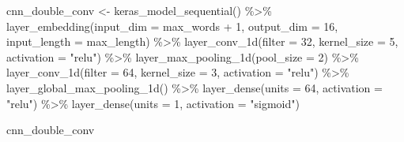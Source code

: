 \documentclass[
]{krantz}
\makeatletter
\newenvironment{Shaded}{\begin{snugshade}}{\end{snugshade}}
\newcommand{\AttributeTok}[1]{\textcolor[rgb]{0.77,0.63,0.00}{#1}}
\newcommand{\DecValTok}[1]{\textcolor[rgb]{0.00,0.00,0.81}{#1}}
\newcommand{\FunctionTok}[1]{\textcolor[rgb]{0.00,0.00,0.00}{#1}}
\newcommand{\NormalTok}[1]{#1}
\newcommand{\OtherTok}[1]{\textcolor[rgb]{0.56,0.35,0.01}{#1}}
\newcommand{\SpecialCharTok}[1]{\textcolor[rgb]{0.00,0.00,0.00}{#1}}
\newcommand{\StringTok}[1]{\textcolor[rgb]{0.31,0.60,0.02}{#1}}
\newenvironment{kframe}{%
\medskip{}
\setlength{\fboxsep}{.8em}
 \def\at@end@of@kframe{}%
 \ifinner\ifhmode%
  \def\at@end@of@kframe{\end{minipage}}%
  \begin{minipage}{\columnwidth}%
 \fi\fi%
 \def\FrameCommand##1{\hskip\@totalleftmargin \hskip-\fboxsep
 \colorbox{shadecolor}{##1}\hskip-\fboxsep
     \hskip-\linewidth \hskip-\@totalleftmargin \hskip\columnwidth}%
 \MakeFramed {\advance\hsize-\width
   \@totalleftmargin\z@ \linewidth\hsize
   \@setminipage}}%
 {\par\unskip\endMakeFramed%
 \at@end@of@kframe}
\renewenvironment{Shaded}{\begin{kframe}}{\end{kframe}}
\makeatother
\begin{document}
\begin{Shaded}
\begin{Highlighting}[]
\NormalTok{cnn\_double\_conv }\OtherTok{\textless{}{-}} \FunctionTok{keras\_model\_sequential}\NormalTok{() }\SpecialCharTok{\%\textgreater{}\%}
  \FunctionTok{layer\_embedding}\NormalTok{(}\AttributeTok{input\_dim =}\NormalTok{ max\_words }\SpecialCharTok{+} \DecValTok{1}\NormalTok{, }\AttributeTok{output\_dim =} \DecValTok{16}\NormalTok{,}
                  \AttributeTok{input\_length =}\NormalTok{ max\_length) }\SpecialCharTok{\%\textgreater{}\%}
  \FunctionTok{layer\_conv\_1d}\NormalTok{(}\AttributeTok{filter =} \DecValTok{32}\NormalTok{, }\AttributeTok{kernel\_size =} \DecValTok{5}\NormalTok{, }\AttributeTok{activation =} \StringTok{"relu"}\NormalTok{) }\SpecialCharTok{\%\textgreater{}\%}
  \FunctionTok{layer\_max\_pooling\_1d}\NormalTok{(}\AttributeTok{pool\_size =} \DecValTok{2}\NormalTok{) }\SpecialCharTok{\%\textgreater{}\%}
  \FunctionTok{layer\_conv\_1d}\NormalTok{(}\AttributeTok{filter =} \DecValTok{64}\NormalTok{, }\AttributeTok{kernel\_size =} \DecValTok{3}\NormalTok{, }\AttributeTok{activation =} \StringTok{"relu"}\NormalTok{) }\SpecialCharTok{\%\textgreater{}\%}
  \FunctionTok{layer\_global\_max\_pooling\_1d}\NormalTok{() }\SpecialCharTok{\%\textgreater{}\%}
  \FunctionTok{layer\_dense}\NormalTok{(}\AttributeTok{units =} \DecValTok{64}\NormalTok{, }\AttributeTok{activation =} \StringTok{"relu"}\NormalTok{) }\SpecialCharTok{\%\textgreater{}\%}
  \FunctionTok{layer\_dense}\NormalTok{(}\AttributeTok{units =} \DecValTok{1}\NormalTok{, }\AttributeTok{activation =} \StringTok{"sigmoid"}\NormalTok{)}

\NormalTok{cnn\_double\_conv}
\end{Highlighting}
\end{Shaded}
\end{document}
